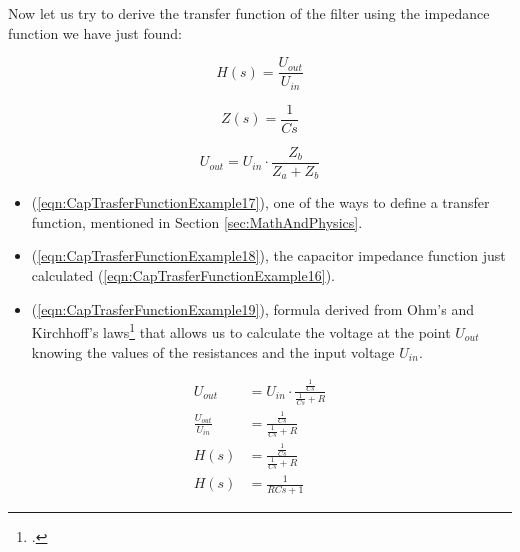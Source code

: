 \documentclass[a4paper, 10pt, final]{article} %
\begin{document}
    \noindent Now let us try to derive the transfer function of the filter using the impedance function we have just found:
    \begin{figure}[H]
        \centering
        \begin{minipage}[b]{.3\linewidth}
            \centering
            \begin{equation} \label{eqn:CapTrasferFunctionExample17}
                H(s) = \frac{U_{out}}{U_{in}}
            \end{equation}
        \end{minipage}
        \hspace{0.04\linewidth}
        \begin{minipage}[b]{.3\linewidth}
            \centering
            \begin{equation} \label{eqn:CapTrasferFunctionExample18}
                Z(s) = \frac{1}{C s}
            \end{equation}
        \end{minipage}
        \hspace*{0.04\linewidth}
        \begin{minipage}[b]{.3\linewidth}
            \centering
            \begin{equation} \label{eqn:CapTrasferFunctionExample19}
                U_{out} = U_{in} \cdot \frac{Z_b}{Z_a + Z_b}
            \end{equation}
        \end{minipage}
    \end{figure}
    \begin{itemize}
        \item (\ref{eqn:CapTrasferFunctionExample17}), one of the ways to define a transfer function, mentioned in Section \ref{sec:MathAndPhysics}.
        \item (\ref{eqn:CapTrasferFunctionExample18}), the capacitor impedance function just calculated (\ref{eqn:CapTrasferFunctionExample16}).
        \item (\ref{eqn:CapTrasferFunctionExample19}), formula derived from Ohm's and Kirchhoff's laws\footcite[]{Kirchhoff:Wiki} that allows us to calculate the voltage at the point $U_{out}$ knowing the values of the resistances and the input voltage $U_{in}$.
    \end{itemize}
    \begin{align}
        U_{out} &= U_{in} \cdot \frac{\frac{1}{C s}}{\frac{1}{C s}+R} \label{eqn:CapTrasferFunctionExample20} \\
        \frac{U_{out}}{U_{in}} &= \frac{\frac{1}{C s}}{\frac{1}{C s}+R} \label{eqn:CapTrasferFunctionExample21} \\
        H(s) &= \frac{\frac{1}{C s}}{\frac{1}{C s}+R} \label{eqn:CapTrasferFunctionExample22} \\
        H(s) &= \frac{1}{R C s + 1} \label{eqn:CapTrasferFunctionExample23}
    \end{align}
\end{document}
